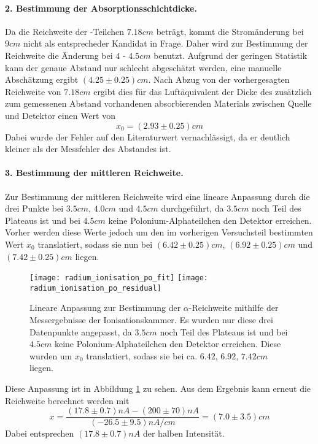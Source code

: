 \documentclass{../Misc/MontavonLaTeX/Montavon}
\newcommand{\halfwidth}{0.48\textwidth}
\begin{document}
\paragraph{2. Bestimmung der Absorptionsschichtdicke.}
Da die Reichweite der -Teilchen $7.18 \unit{cm}$ beträgt, kommt die Stromänderung bei $9 \unit{cm}$ nicht als entsprecheder Kandidat in Frage. Daher wird zur Bestimmung der Reichweite die Änderung bei $4$ - $4.5 \unit{cm}$ benutzt. Aufgrund der geringen Statistik kann der genaue Abstand nur schlecht abgeschätzt werden, eine manuelle Abschätzung ergibt $(4.25 \pm 0.25) \unit{cm}$. 
Nach Abzug von der vorhergesagten Reichweite von $7.18 \unit{cm}$ ergibt dies für das Luftäquivalent der Dicke des zusätzlich zum gemessenen Abstand vorhandenen absorbierenden Materials zwischen Quelle und Detektor einen Wert von
\[
	x_0 = (2.93 \pm 0.25) \unit{cm}
\]
Dabei wurde der Fehler auf den Literaturwert vernachlässigt, da er deutlich kleiner als der Messfehler des Abstandes ist.

\paragraph{3. Bestimmung der mittleren Reichweite.}
Zur Bestimmung der mittleren Reichweite wird eine lineare Anpassung durch die drei Punkte bei $3.5 \unit{cm}$, $4.0 \unit{cm}$ und $4.5 \unit{cm}$ durchgeführt, da $3.5 \unit{cm}$ noch Teil des Plateaus ist und bei $4.5 \unit{cm}$ keine Polonium-Alphateilchen den Detektor erreichen. Vorher werden diese Werte jedoch um den im vorherigen Versuchsteil bestimmten Wert $x_0$ translatiert, sodass sie nun bei $(6.42 \pm 0.25) \unit{cm}$, $(6.92 \pm 0.25) \unit{cm}$ und $(7.42 \pm 0.25) \unit{cm}$ liegen. 

\begin{figure}[htbp]
\centering
\texttt{[image: radium\_ionisation\_po\_fit]}
\texttt{[image: radium\_ionisation\_po\_residual]}
\caption{Lineare Anpassung zur Bestimmung der $\alpha$-Reichweite mithilfe der Messergebnisse der Ionisationskammer. Es wurden nur diese drei Datenpunkte angepasst, da $3.5 \unit{cm}$ noch Teil des Plateaus ist und bei $4.5 \unit{cm}$ keine Polonium-Alphateilchen den Detektor erreichen. Diese wurden um $x_0$ translatiert, sodass sie bei ca. $6.42$, $6.92$, $7.42 \unit{cm}$ liegen.}
\label{fig:radium_range2_fit}
\end{figure}

Diese Anpassung ist in Abbildung \ref{fig:radium_range2_fit} zu sehen. Aus dem Ergebnis kann erneut die Reichweite berechnet werden mit
\[
	x = \frac{(17.8 \pm 0.7) \unit{nA} - (200 \pm 70) \unit{nA}}{(-26.5 \pm 9.5) \unit{nA/cm}} = (7.0 \pm 3.5) \unit{cm}
\]
Dabei entsprechen $(17.8 \pm 0.7) \unit{nA}$ der halben Intensität.
\end{document}
